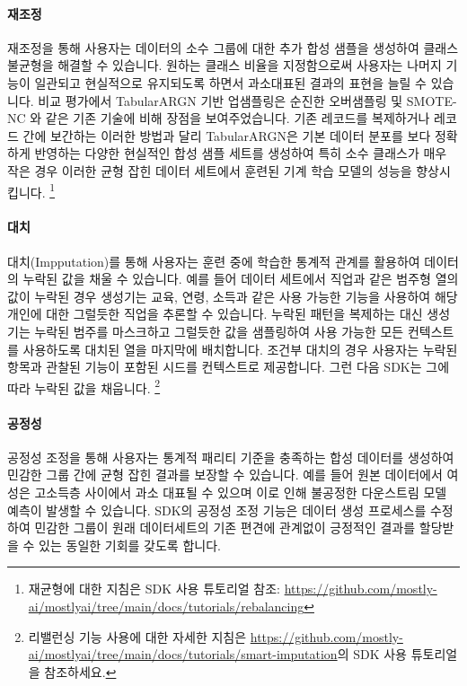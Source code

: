 \paragraph{재조정}
재조정을 통해 사용자는 데이터의 소수 그룹에 대한 추가 합성 샘플을 생성하여 클래스 불균형을 해결할 수 있습니다. 원하는 클래스 비율을 지정함으로써 사용자는 나머지 기능이 일관되고 현실적으로 유지되도록 하면서 과소대표된 결과의 표현을 늘릴 수 있습니다. \cite{upsampling} 비교 평가에서 TabularARGN 기반 업샘플링은 순진한 오버샘플링 \cite{imblearn_naive} 및 SMOTE-NC \cite{imblearn_smotenc}와 같은 기존 기술에 비해 장점을 보여주었습니다. 기존 레코드를 복제하거나 레코드 간에 보간하는 이러한 방법과 달리 TabularARGN은 기본 데이터 분포를 보다 정확하게 반영하는 다양한 현실적인 합성 샘플 세트를 생성하여 특히 소수 클래스가 매우 작은 경우 이러한 균형 잡힌 데이터 세트에서 훈련된 기계 학습 모델의 성능을 향상시킵니다. \footnote{재균형에 대한 지침은 SDK 사용 튜토리얼 참조: \url{https://github.com/mostly-ai/mostlyai/tree/main/docs/tutorials/rebalancing}}


\paragraph{대치}
대치(Impputation)를 통해 사용자는 훈련 중에 학습한 통계적 관계를 활용하여 데이터의 누락된 값을 채울 수 있습니다. 예를 들어 데이터 세트에서 직업과 같은 범주형 열의 값이 누락된 경우 생성기는 교육, 연령, 소득과 같은 사용 가능한 기능을 사용하여 해당 개인에 대한 그럴듯한 직업을 추론할 수 있습니다.  누락된 패턴을 복제하는 대신 생성기는 누락된 범주를 마스크하고 그럴듯한 값을 샘플링하여 사용 가능한 모든 컨텍스트를 사용하도록 대치된 열을 마지막에 배치합니다. 조건부 대치의 경우 사용자는 누락된 항목과 관찰된 기능이 포함된 시드를 컨텍스트로 제공합니다. 그런 다음 SDK는 그에 따라 누락된 값을 채웁니다.
\footnote{리밸런싱 기능 사용에 대한 자세한 지침은 \url{https://github.com/mostly-ai/mostlyai/tree/main/docs/tutorials/smart-imputation}의 SDK 사용 튜토리얼을 참조하세요.}


\paragraph{공정성}
공정성 조정을 통해 사용자는 통계적 패리티 기준을 충족하는 합성 데이터를 생성하여 민감한 그룹 간에 균형 잡힌 결과를 보장할 수 있습니다. 예를 들어 원본 데이터에서 여성은 고소득층 사이에서 과소 대표될 수 있으며 이로 인해 불공정한 다운스트림 모델 예측이 발생할 수 있습니다. SDK의 공정성 조정 기능은 데이터 생성 프로세스를 수정하여 민감한 그룹이 원래 데이터세트의 기존 편견에 관계없이 긍정적인 결과를 할당받을 수 있는 동일한 기회를 갖도록 합니다.

